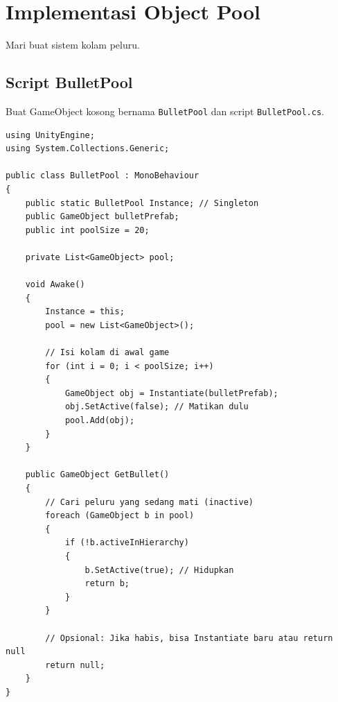 
\section{Implementasi Object Pool}

Mari buat sistem kolam peluru.

\subsection{Script BulletPool}
Buat GameObject kosong bernama \texttt{BulletPool} dan script \texttt{BulletPool.cs}.

\begin{lstlisting}[language={[Sharp]C}]
using UnityEngine;
using System.Collections.Generic;

public class BulletPool : MonoBehaviour
{
    public static BulletPool Instance; // Singleton
    public GameObject bulletPrefab;
    public int poolSize = 20;

    private List<GameObject> pool;

    void Awake()
    {
        Instance = this;
        pool = new List<GameObject>();

        // Isi kolam di awal game
        for (int i = 0; i < poolSize; i++)
        {
            GameObject obj = Instantiate(bulletPrefab);
            obj.SetActive(false); // Matikan dulu
            pool.Add(obj);
        }
    }

    public GameObject GetBullet()
    {
        // Cari peluru yang sedang mati (inactive)
        foreach (GameObject b in pool)
        {
            if (!b.activeInHierarchy)
            {
                b.SetActive(true); // Hidupkan
                return b;
            }
        }
        
        // Opsional: Jika habis, bisa Instantiate baru atau return null
        return null; 
    }
}
\end{lstlisting}
